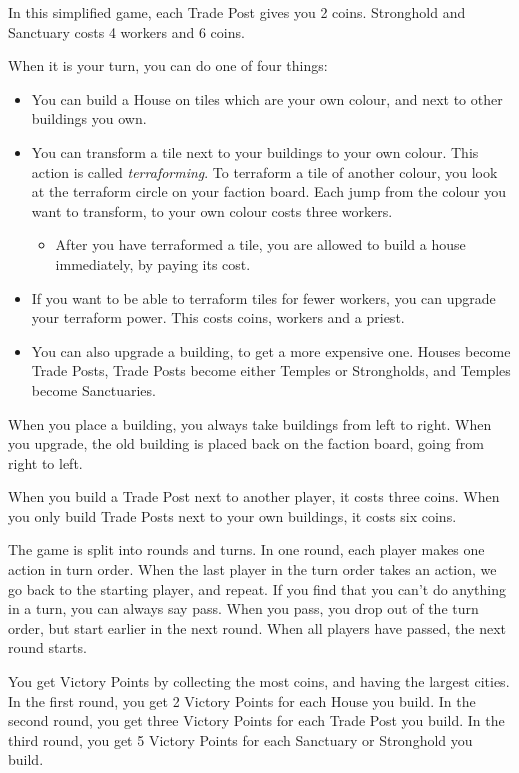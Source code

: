 In this simplified game, each Trade Post gives you 2 coins. Stronghold and Sanctuary costs 4 workers and 6 coins.

When it is your turn, you can do one of four things:
\begin{itemize}
\item You can build a House on tiles which are your own colour, and next to other buildings you own. 
\item You can transform a tile next to your buildings to your own colour. This action is called \textit{terraforming}. To terraform a tile of another colour, you look at the terraform circle on your faction board. Each jump from the colour you want to transform, to your own colour costs three workers.
\begin{itemize}
\item After you have terraformed a tile, you are allowed to build a house immediately, by paying its cost.
\end{itemize}
\item If you want to be able to terraform tiles for fewer workers, you can upgrade your terraform power. This costs coins, workers and a priest.
\item You can also upgrade a building, to get a more expensive one. Houses become Trade Posts, Trade Posts become either Temples or Strongholds, and Temples become Sanctuaries.
\end{itemize}

When you place a building, you always take buildings from left to right. 
When you upgrade, the old building is placed back on the faction board, going from right to left.

When you build a Trade Post next to another player, it costs three coins. When you only build Trade Posts next to your own buildings, it costs six coins.

The game is split into rounds and turns. In one round, each player makes one action in turn order. When the last player in the turn order takes an action, we go back to the starting player, and repeat. If you find that you can’t do anything in a turn, you can always say pass. When you pass, you drop out of the turn order, but start earlier in the next round. When all players have passed, the next round starts.

You get Victory Points by collecting the most coins, and having the largest cities.
In the first round, you get 2 Victory Points for each House you build.
In the second round, you get three Victory Points for each Trade Post you build.
In the third round, you get 5 Victory Points for each Sanctuary or Stronghold you build.

